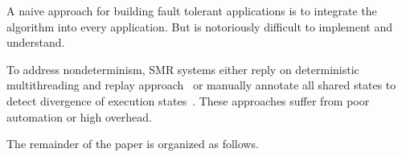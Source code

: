 A naive approach for building fault tolerant applications is to integrate the \paxos algorithm 
into every application. But \paxos is notoriously difficult to implement and understand.

To address nondeterminism, SMR systems either reply on deterministic multithreading and replay 
approach~\cite{rex:eurosys14} or manually annotate all shared states to detect divergence of execution 
states~\cite{eve:osdi12}. These approaches suffer from poor automation or high overhead.


The remainder of the paper is organized as follows.
